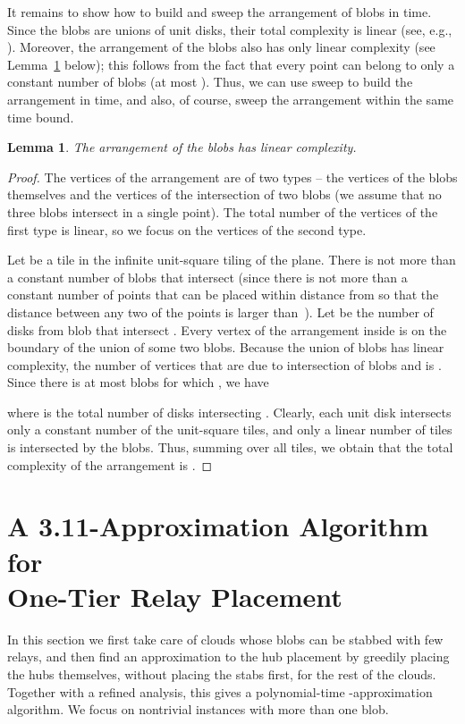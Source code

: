 \documentclass[11pt,a4paper]{article}
\newtheorem{lemma}{Lemma}
\theoremstyle{definition}
\theoremstyle{remark}
\newcommand{\mytitlebreak}{\texorpdfstring{\\}{ }}
\begin{document}
It remains to show how to build and sweep the arrangement of blobs in  time.
Since the blobs are unions of unit disks, their total complexity is linear (see, e.g., \citet[Theorem~13.9]{berg08computational}). Moreover, the arrangement of the blobs also has only linear complexity (see Lemma~\ref{lem:arr} below); this follows from the fact that every point can belong to only a constant number of blobs (at most ). Thus, we can use sweep to build the arrangement in  time, and also, of course, sweep the arrangement within the same time bound.

\begin{lemma}\label{lem:arr}
The arrangement of the blobs has linear complexity.
\end{lemma}
\begin{proof}
The vertices of the arrangement are of two types -- the vertices of the blobs themselves and the vertices of the intersection of two blobs (we assume that no three blobs intersect in a single point). The total number of the vertices of the first type is linear, so we focus on the vertices of the second type.

Let  be a tile in the infinite unit-square tiling of the plane. There is not more than a constant number  of blobs that intersect  (since there is not more than a constant number of points that can be placed within distance  from  so that the distance between any two of the points is larger than~). Let  be the number of disks from blob  that intersect . Every vertex of the arrangement inside  is on the boundary of the union of some two blobs. Because the union of blobs has linear complexity, the number of vertices that are due to intersection of blobs  and  is . Since there is at most  blobs for which , we have

where  is the total number of disks intersecting . Clearly, each unit disk intersects only a constant number of the unit-square tiles, and only a linear number of tiles is intersected by the blobs. Thus, summing over all tiles, we obtain that the total complexity of the arrangement is .
\end{proof}




\section{A 3.11-Approximation Algorithm for\mytitlebreak One-Tier Relay Placement}\label{sec_apx1tierim}

In this section we first take care of clouds whose blobs can be stabbed with few relays, and then find an approximation to the hub placement by greedily placing the hubs themselves, without placing the stabs first, for the rest of the clouds. Together with a refined analysis, this gives a polynomial-time -approximation algorithm.  We focus on nontrivial instances with more than one blob.
\end{document}
